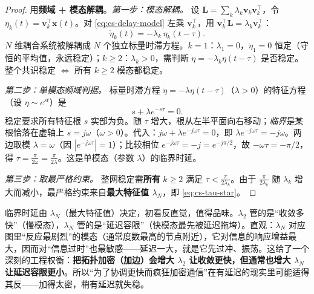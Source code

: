 \begin{proof}
用\textbf{频域 + 模态解耦}。\emph{第一步：模态解耦。} 设 $\mathbf{L}=\sum_k\lambda_k\mathbf{v}_k\mathbf{v}_k^\top$，令 $\eta_k(t)=\mathbf{v}_k^\top\mathbf{x}(t)$。对 \cref{eq:cs-delay-model} 左乘 $\mathbf{v}_k^\top$，用 $\mathbf{v}_k^\top\mathbf{L}=\lambda_k\mathbf{v}_k^\top$：
\begin{equation}
  \dot\eta_k(t)=-\lambda_k\,\eta_k(t-\tau).
  \label{eq:cs-modal-delay}
\end{equation}
$N$ 维耦合系统被解耦成 $N$ 个独立标量时滞方程。$k=1$：$\lambda_1=0$，$\dot\eta_1=0$ 恒定（守恒的平均值，永远稳定）；$k\ge2$：$\lambda_k>0$，需判断 $\dot\eta=-\lambda_k\eta(t-\tau)$ 是否稳定。整个共识稳定 $\iff$ 所有 $k\ge2$ 模态都稳定。

\emph{第二步：单模态频域判据。} 标量时滞方程 $\dot\eta=-\lambda\eta(t-\tau)$（$\lambda>0$）的特征方程（设 $\eta\sim e^{st}$）是
\begin{equation}
  s+\lambda e^{-s\tau}=0.
  \label{eq:cs-char}
\end{equation}
稳定要求所有特征根 $s$ 实部为负。随 $\tau$ 增大，根从左半平面向右移动；\emph{临界}是某根恰落在虚轴上 $s=j\omega$（$\omega>0$）。代入：$j\omega+\lambda e^{-j\omega\tau}=0$，即 $\lambda e^{-j\omega\tau}=-j\omega$。两边取模 $\lambda=\omega$（因 $|e^{-j\omega\tau}|=1$）；比较相位 $e^{-j\omega\tau}=-j=e^{-j\pi/2}$，故 $-\omega\tau=-\pi/2$，得 $\tau=\tfrac{\pi}{2\omega}=\tfrac{\pi}{2\lambda}$。这是单模态（参数 $\lambda$）的临界时延。

\emph{第三步：取最严格约束。} 整网稳定需\textbf{所有} $k\ge2$ 满足 $\tau<\tfrac{\pi}{2\lambda_k}$。由于 $\tfrac{\pi}{2\lambda_k}$ 随 $\lambda_k$ 增大而减小，最严格约束来自\textbf{最大特征值 $\lambda_N$}，即 \cref{eq:cs-tau-star}。
\end{proof}

\begin{insight}\label{ins:cs-delay-lamN}
临界时延由 $\lambda_N$（最大特征值）决定，初看反直觉，值得品味。$\lambda_2$ 管的是“收敛多快”（慢模态），$\lambda_N$ 管的是“延迟容限”（快模态最先被延迟拖垮）。直观：$\lambda_N$ 对应图里“反应最剧烈”的模态（通常度数最高的节点附近），它对信息的响应增益最大，因而对“信息过时”也最敏感——延迟一大，就是它先过冲、振荡。这给了一个深刻的工程权衡：\textbf{把拓扑加密（加边）会增大 $\lambda_2$ 让收敛更快，但通常也增大 $\lambda_N$ 让延迟容限更小}。所以“为了协调更快而疯狂加密通信”在有延迟的现实里可能适得其反——加得太密，稍有延迟就失稳。
\end{insight}

